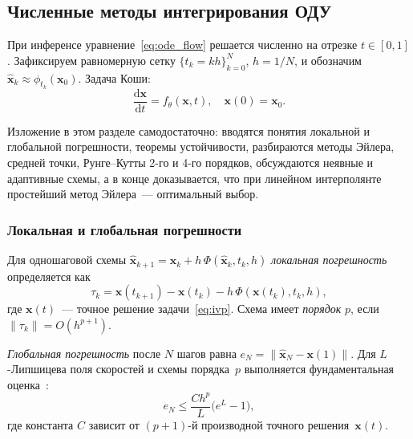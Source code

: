 \subsection{Численные методы интегрирования ОДУ}
\label{sec:ode_methods}

При инференсе уравнение~\eqref{eq:ode_flow} решается численно на отрезке $t\in[0,1]$. Зафиксируем равномерную сетку $\{t_k = kh\}_{k=0}^{N}$, $h=1/N$, и обозначим $\hat{\mathbf{x}}_k\approx\phi_{t_k}(\mathbf{x}_0)$. Задача Коши:
\begin{equation}
    \frac{\mathrm{d}\mathbf{x}}{\mathrm{d}t} = f_\theta(\mathbf{x}, t), \quad \mathbf{x}(0) = \mathbf{x}_0.
    \label{eq:ivp}
\end{equation}

Изложение в этом разделе самодостаточно: вводятся понятия локальной и глобальной погрешности, теоремы устойчивости, разбираются методы Эйлера, средней точки, Рунге--Кутты 2-го и 4-го порядков, обсуждаются неявные и адаптивные схемы, а в конце доказывается, что при линейном интерполянте простейший метод Эйлера~--- оптимальный выбор.

\subsubsection{Локальная и глобальная погрешности}

\begin{definition}
Для одношаговой схемы $\hat{\mathbf{x}}_{k+1} = \hat{\mathbf{x}}_k + h\,\Phi(\hat{\mathbf{x}}_k, t_k, h)$ \emph{локальная погрешность} определяется как
\[
    \tau_k = \mathbf{x}(t_{k+1}) - \mathbf{x}(t_k) - h\,\Phi(\mathbf{x}(t_k), t_k, h),
\]
где $\mathbf{x}(t)$~--- точное решение задачи~\eqref{eq:ivp}.
Схема имеет \emph{порядок} $p$, если $\lVert\tau_k\rVert = O(h^{p+1})$.
\end{definition}

\begin{definition}
\emph{Глобальная погрешность} после $N$ шагов равна $e_N = \lVert\hat{\mathbf{x}}_N - \mathbf{x}(1)\rVert$. Для $L$-Липшицева поля скоростей и схемы порядка~$p$ выполняется фундаментальная оценка~\cite{Runge1895, hairer1993solving}:
\begin{equation}
    e_N \leq \frac{C h^p}{L}\bigl(e^{L} - 1\bigr),
    \label{eq:global_error}
\end{equation}
где константа $C$ зависит от $(p{+}1)$-й производной точного решения~$\mathbf{x}(t)$.
\end{definition}

